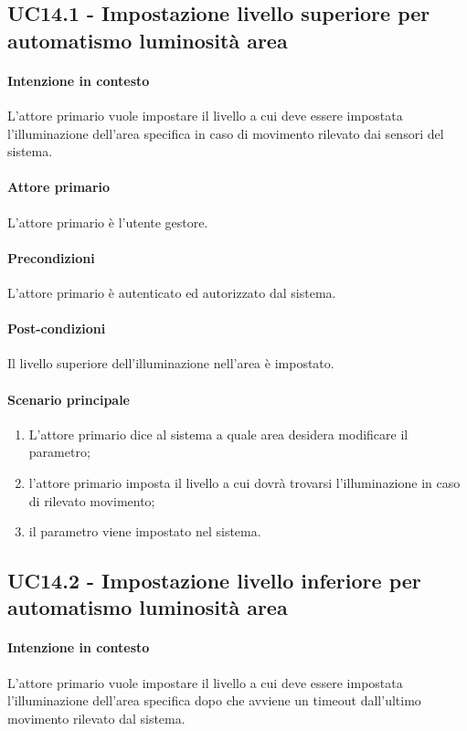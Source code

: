 \subsection{UC14.1 - Impostazione livello superiore per automatismo luminosità area}\label{uc:14.1}
\paragraph{Intenzione in contesto} L'attore primario vuole impostare il livello a cui deve essere impostata l'illuminazione dell'area specifica in caso di movimento rilevato dai sensori del sistema.
\paragraph{Attore primario} L'attore primario è l'utente gestore.
\paragraph{Precondizioni}  L'attore primario è autenticato ed autorizzato dal sistema.
\paragraph{Post-condizioni} Il livello superiore dell'illuminazione nell'area è impostato.
\paragraph{Scenario principale}
\begin{enumerate}
    \item L'attore primario dice al sistema a quale area desidera modificare il parametro;
    \item l'attore primario imposta il livello a cui dovrà trovarsi l'illuminazione in caso di rilevato movimento;
    \item il parametro viene impostato nel sistema.
\end{enumerate}

\subsection{UC14.2 - Impostazione livello inferiore per automatismo luminosità area}\label{uc:14.2}

\paragraph{Intenzione in contesto} L'attore primario vuole impostare il livello a cui deve essere impostata l'illuminazione dell'area specifica dopo che avviene un timeout dall'ultimo movimento rilevato dal sistema.
